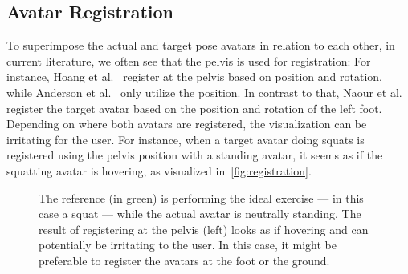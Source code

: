 \subsection{Avatar Registration \label{sec:register}}
To superimpose the actual and target pose avatars in relation to each other, in current literature, we often see that the pelvis is used for registration:  For instance, Hoang et al.~\cite{hoang2016onebody} register at the pelvis based on position and rotation, while Anderson et al.~\cite{anderson2013youmove} only utilize the position. In contrast to that, Naour et al.~\cite{naour2019superimpose} register the target avatar based on the position and rotation of the left foot. Depending on where both avatars are registered, the visualization can be irritating for the user. For instance, when a target avatar doing squats is registered using the pelvis position with a standing avatar, it seems as if the squatting avatar is hovering, as visualized in~\autoref{fig:registration}.
\begin{figure}[h!]
	\centering    {}
	\caption[Example of different methods registering squatting skeletons.]{The reference (in green) is performing the ideal exercise --- in this case a squat --- while the actual avatar is neutrally standing. The result of registering at the pelvis (left) looks as if hovering and can potentially be irritating to the user. In this case, it might be preferable to register the avatars at the foot or the ground. \label{fig:registration}}
\end{figure}


